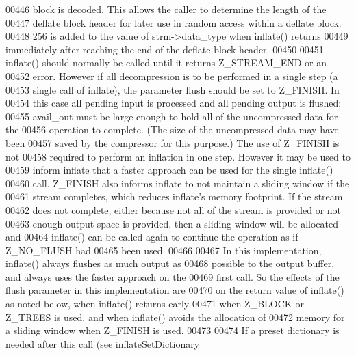 \begin{DoxyCode}
00446 \textcolor{comment}{  block is decoded.  This allows the caller to determine the length of the}
00447 \textcolor{comment}{  deflate block header for later use in random access within a deflate block.}
00448 \textcolor{comment}{  256 is added to the value of strm->data\_type when inflate() returns}
00449 \textcolor{comment}{  immediately after reaching the end of the deflate block header.}
00450 \textcolor{comment}{}
00451 \textcolor{comment}{    inflate() should normally be called until it returns Z\_STREAM\_END or an}
00452 \textcolor{comment}{  error.  However if all decompression is to be performed in a single step (a}
00453 \textcolor{comment}{  single call of inflate), the parameter flush should be set to Z\_FINISH.  In}
00454 \textcolor{comment}{  this case all pending input is processed and all pending output is flushed;}
00455 \textcolor{comment}{  avail\_out must be large enough to hold all of the uncompressed data for the}
00456 \textcolor{comment}{  operation to complete.  (The size of the uncompressed data may have been}
00457 \textcolor{comment}{  saved by the compressor for this purpose.) The use of Z\_FINISH is not}
00458 \textcolor{comment}{  required to perform an inflation in one step.  However it may be used to}
00459 \textcolor{comment}{  inform inflate that a faster approach can be used for the single inflate()}
00460 \textcolor{comment}{  call.  Z\_FINISH also informs inflate to not maintain a sliding window if the}
00461 \textcolor{comment}{  stream completes, which reduces inflate's memory footprint.  If the stream}
00462 \textcolor{comment}{  does not complete, either because not all of the stream is provided or not}
00463 \textcolor{comment}{  enough output space is provided, then a sliding window will be allocated and}
00464 \textcolor{comment}{  inflate() can be called again to continue the operation as if Z\_NO\_FLUSH had}
00465 \textcolor{comment}{  been used.}
00466 \textcolor{comment}{}
00467 \textcolor{comment}{     In this implementation, inflate() always flushes as much output as}
00468 \textcolor{comment}{  possible to the output buffer, and always uses the faster approach on the}
00469 \textcolor{comment}{  first call.  So the effects of the flush parameter in this implementation are}
00470 \textcolor{comment}{  on the return value of inflate() as noted below, when inflate() returns early}
00471 \textcolor{comment}{  when Z\_BLOCK or Z\_TREES is used, and when inflate() avoids the allocation of}
00472 \textcolor{comment}{  memory for a sliding window when Z\_FINISH is used.}
00473 \textcolor{comment}{}
00474 \textcolor{comment}{     If a preset dictionary is needed after this call (see inflateSetDictionary}

\end{DoxyCode}
